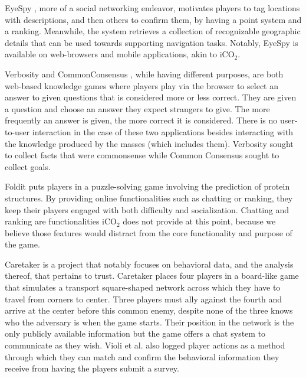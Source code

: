 \documentclass[preprint,authoryear,12pt]{elsarticle}
\makeatletter
\renewcommand{\paragraph}{\@startsection{paragraph}{4}{\z@}%
  {-3.25ex\@plus -1ex \@minus -.2ex}%
  {1.5ex \@plus .2ex}%
  {\normalfont\normalsize\mdseries}}
\makeatother
\begin{document}
EyeSpy \citep{Bell:2009}, more of a social networking endeavor, motivates players to tag locations with descriptions, and then others to confirm them, by having a point system and a ranking. Meanwhile, the system retrieves a collection of recognizable geographic details that can be used towards supporting navigation tasks. Notably, EyeSpy is available on web-browsers and mobile applications, akin to iCO$_2$.


Verbosity \citep{vonAhnVerb:2006} and CommonConsensus \citep{lieberman2007}, while having different purposes, are both web-based knowledge games where players play via the browser to select an answer to given questions that is considered more or less correct. They are given a question and choose an answer they expect strangers to give. The more frequently an answer is given, the more correct it is considered. There is no user-to-user interaction in the case of these two applications besides interacting with the knowledge produced by the masses (which includes them). Verbosity sought to collect facts that were commonsense while Common Consensus sought to collect goals.


Foldit \citep{cooper2010predicting} puts players in a puzzle-solving game involving the prediction of protein structures. By providing online functionalities such as chatting or ranking, they keep their players engaged with both difficulty and socialization. Chatting and ranking are functionalities iCO$_2$ does not provide at this point, because we believe those features would distract from the core functionality and purpose of the game.


Caretaker \citep{Violi:2011} is a project that notably focuses on behavioral data, and the analysis thereof, that pertains to trust. Caretaker places four players in a board-like game that simulates a transport square-shaped network across which they have to travel from corners to center. Three players must ally against the fourth and arrive at the center before this common enemy, despite none of the three knows who the adversary is when the game starts. Their position in the network is the only publicly available information but the game offers a chat system to communicate as they wish. Violi et al. also logged player actions as a method through which they can match and confirm the behavioral information they receive from having the players submit a survey.
\end{document}
